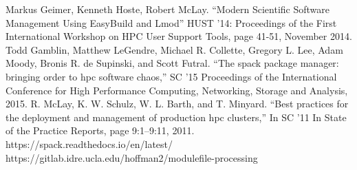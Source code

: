 \documentclass[conference]{IEEEtran}
\begin{document}
\begin{thebibliography}{00}
 Markus Geimer, Kenneth Hoste, Robert McLay. ``Modern Scientific Software Management Using EasyBuild and Lmod'' HUST '14: Proceedings of the First International Workshop on HPC User Support Tools, page 41-51, November 2014.
 Todd Gamblin, Matthew LeGendre, Michael R. Collette, Gregory L. Lee, Adam Moody, Bronis R. de Supinski, and Scott Futral. ``The spack package manager: bringing order to hpc software chaos,'' SC ’15 Proceedings of the International Conference for High Performance Computing, Networking, Storage and Analysis, 2015.
 R. McLay, K. W. Schulz, W. L. Barth, and T. Minyard. ``Best practices for the deployment and management of production hpc clusters,'' In SC ’11 In State of the Practice Reports, page 9:1–9:11, 2011.
 https://spack.readthedocs.io/en/latest/
 https://gitlab.idre.ucla.edu/hoffman2/modulefile-processing
\end{thebibliography}
\end{document}
